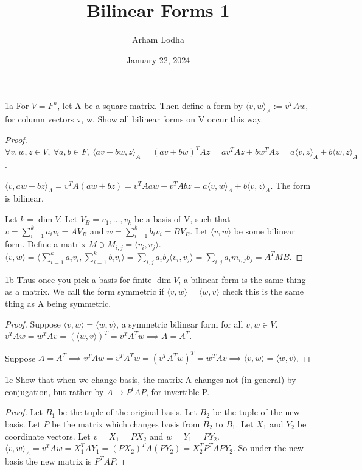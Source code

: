 \documentclass{article}
\newcommand{\angles}[1]{\langle #1 \rangle}
\begin{document}
\title{Bilinear Forms 1}
\author{Arham Lodha}%
\date{January 22, 2024}%
\maketitle

\begin{PROB}{1a}\label{Problem 1a.}
    For $V = F^n$, let A be a square matrix. Then define a form by $\angles{v, w}_A := v^TAw$, for column vectors v, w. Show all bilinear forms on V occur this way. 
\end{PROB}
\begin{proof}
    $\forall v, w, z \in V,~ \forall a, b \in F,~ \angles{av + bw, z}_A = (av + bw)^T A z = av^TAz + bw^TAz = a \angles{v, z}_A + b \angles{w, z}_A$.
    
    $\angles{v, aw + bz}_A = v^TA(aw + bz) = v^TAaw + v^TAbz = a\angles{v,w}_A + b\angles{v, z}_A$. The form is bilinear.

    Let $k = \dim V$. Let $V_B = v_1, \dots, v_k$ be a basis of V, such that $v = \sum_{i=1}^{k} a_iv_i = AV_B$ and $w = \sum_{i=1}^{k} b_iv_i = BV_B$. Let $\angles{v, w}$ be some bilinear form. Define a matrix $M \ni M_{i, j} = \angles{v_i, v_j}$. $\angles{v, w} = \angles{\sum_{i=1}^{k} a_iv_i, \sum_{i=1}^{k} b_iv_i} = \sum_{i, j} a_ib_j \angles{v_i, v_j} = \sum_{i, j} a_im_{i, j}b_j = A^T M B$.           
\end{proof}

\begin{PROB}{1b}\label{Problem 1b.}
    Thus once you pick a basis for finite $\dim V$, a bilinear form is the same thing as a matrix. We call the form symmetric if $\angles{v, w} = \angles{w, v}$ check this is the same thing as A being symmetric. 
\end{PROB}
\begin{proof}
    Suppose $\angles{v, w} = \angles{w, v}$, a symmetric bilinear form for all $v, w \in V$. $v^TAw = w^TAv = (\angles{w, v})^T = v^TA^Tw \implies A = A^T$.
    
    Suppose $A = A^T \implies v^TAw = v^TA^Tw = (v^TA^Tw)^T = w^TAv \implies \angles{v, w} = \angles{w, v}$. 
\end{proof}

\begin{PROB}{1c}\label{Problem 1c.}
    Show that when we change basis, the matrix A changes not (in general) by conjugation, but rather by $A \to P^t A P$, for invertible P.
\end{PROB}
\begin{proof}
    Let $B_1$ be the tuple of the original basis. Let $B_2$ be the tuple of the new basis. Let $P$ be the matrix which changes basis from $B_2$ to $B_1$. Let $X_1$ and $Y_2$ be coordinate vectors. Let $v = X_1 = PX_2$ and $w = Y_1 = PY_2$. $\angles{v, w}_A = v^TAw = X_1^TAY_1 = (PX_2)^TA(PY_2) = X_2^T P^T A P Y_2$. So under the new basis the new matrix is $P^T A P$. 
\end{proof}
\end{document}
